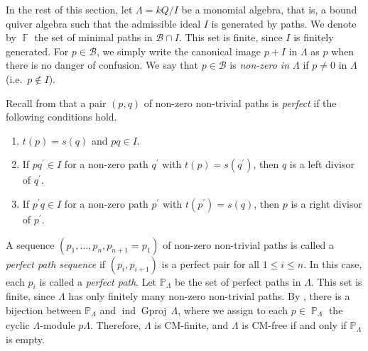 \documentclass[12pt]{amsart}
\numberwithin{equation}{subsection}
\theoremstyle{plain}
\theoremstyle{definition}
\newcommand{\sGproj}{\underline{\operatorname{Gproj}}\,}
\newcommand{\ind}{\operatorname{ind}}
\newcommand{\F}{\operatorname{\mathbb{F}}\nolimits}
\renewcommand{\P}{\operatorname{\mathbb{P}}\nolimits}
\renewcommand{\L}{\Lambda}
\newcommand{\B}{\mathcal{B}}
\begin{document}
In the rest of this section, let $\L = kQ/I$ be a monomial algebra, that is, a bound quiver algebra such that the admissible ideal $I$ is generated by paths. 
We denote by $\F$ the set of minimal paths in $\B\cap I$.
This set is finite, since $I$ is finitely generated.
For $p \in \B$, we simply write the canonical image $p+I$ in $\L$ as $p$ when there is no danger of confusion.
We say that $p \in \B$ is {\it non-zero in $\L$} if $p\neq0$ in $\L$ (i.e.~$p\not\in I$). 





Recall from \cite[Definitions 3.3 and 3.7]{Chen-Shen-Zhou_2018} that a pair $(p, q)$ of non-zero non-trivial paths is {\it perfect} if the following conditions hold.
\begin{enumerate}
\item[(i)] $t(p) = s(q)$ and $pq\in I$.
\item[(ii)] If $pq^\prime\in I$ for a non-zero path $q^\prime$ with $t(p) = s(q^\prime)$, then $q$ is a left divisor of $q^\prime$.
\item[(iii)] If $p^\prime q\in I$ for a non-zero path $p^\prime$ with $t(p^\prime) = s(q)$, then $p$ is a right divisor of $p^\prime$.
\end{enumerate}
A sequence $(p_1, \ldots, p_n, p_{n+1}=p_1)$ of non-zero non-trivial paths is called a {\it perfect path sequence} if $(p_i, p_{i+1})$ is a perfect pair for all $ 1 \leq i \leq n$. 
In this case,  each $p_i$ is called a {\it perfect path}. 
Let $\mathbb{P}_{\L}$ be the set of perfect paths in $\L$.
This set is finite, since $\L$ has only finitely many non-zero non-trivial paths. 
By \cite[Theorem 4.1]{Chen-Shen-Zhou_2018}, there is a bijection between $\mathbb{P}_{\L}$ and $\ind \sGproj\L$, where we assign to each $p\in\P_\L$ the cyclic $\L$-module $p\L$.
Therefore, $\L$ is CM-finite, and $\L$ is CM-free if and only if $\mathbb{P}_\L$ is empty. 
\end{document}
